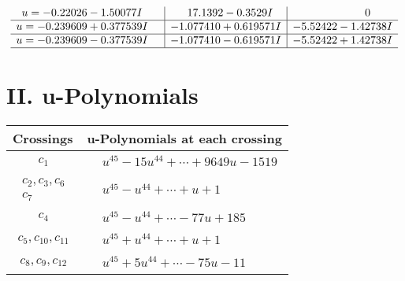 \documentclass[1p]{elsarticle_modified}
\theoremstyle{definition}
\begin{document}
$$\begin{array}{c|c|c}
\begin{aligned}
u &= -0.22026 - 1.50077 I\end{aligned}
 & \phantom{-}17.1392 - 0.3529 I & \phantom{-0.000000 } 0 \\ \hline\begin{aligned}
u &= -0.239609 + 0.377539 I\end{aligned}
 & -1.077410 + 0.619571 I & -5.52422 - 1.42738 I \\ \hline\begin{aligned}
u &= -0.239609 - 0.377539 I\end{aligned}
 & -1.077410 - 0.619571 I & -5.52422 + 1.42738 I\\
 \hline 
 \end{array}$$\newpage
\newpage\renewcommand{\arraystretch}{1}
\centering \section*{ II. u-Polynomials}
\begin{tabular}{m{50pt}|m{274pt}}
Crossings & \hspace{64pt}u-Polynomials at each crossing \\
\hline $$\begin{aligned}c_{1}\end{aligned}$$&$\begin{aligned}
&u^{45}-15 u^{44}+\cdots+9649 u-1519
\end{aligned}$\\
\hline $$\begin{aligned}c_{2},c_{3},c_{6}\\c_{7}\end{aligned}$$&$\begin{aligned}
&u^{45}- u^{44}+\cdots+u+1
\end{aligned}$\\
\hline $$\begin{aligned}c_{4}\end{aligned}$$&$\begin{aligned}
&u^{45}- u^{44}+\cdots-77 u+185
\end{aligned}$\\
\hline $$\begin{aligned}c_{5},c_{10},c_{11}\end{aligned}$$&$\begin{aligned}
&u^{45}+u^{44}+\cdots+u+1
\end{aligned}$\\
\hline $$\begin{aligned}c_{8},c_{9},c_{12}\end{aligned}$$&$\begin{aligned}
&u^{45}+5 u^{44}+\cdots-75 u-11
\end{aligned}$\\
\hline
\end{tabular}\newpage\renewcommand{\arraystretch}{1}
\end{document}
